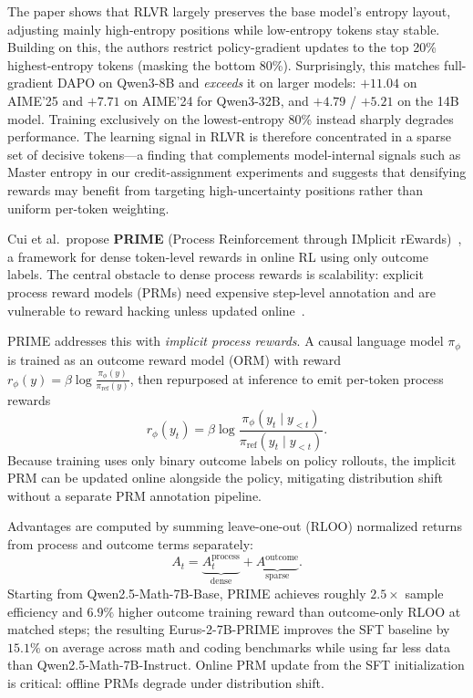 \documentclass[times, 10pt,twocolumn]{article}
\begin{document}
The paper shows that RLVR largely preserves the base model's entropy layout,
adjusting mainly high-entropy positions while low-entropy tokens stay stable.
Building on this, the authors restrict policy-gradient updates to the top 20\%
highest-entropy tokens (masking the bottom 80\%). Surprisingly, this matches
full-gradient DAPO on Qwen3-8B and \emph{exceeds} it on larger models: $+11.04$
on AIME'25 and $+7.71$ on AIME'24 for Qwen3-32B, and $+4.79$ / $+5.21$ on the
14B model. Training exclusively on the lowest-entropy 80\% instead sharply
degrades performance. The learning signal in RLVR is therefore concentrated in a
sparse set of decisive tokens---a finding that complements model-internal
signals such as Master entropy in our credit-assignment experiments and
suggests that densifying rewards may benefit from targeting high-uncertainty
positions rather than uniform per-token weighting.



Cui et al.\ propose \textbf{PRIME} (Process Reinforcement through IMplicit
rEwards)~\cite{cui2025prime}, a framework for dense token-level rewards in
online RL using only outcome labels. The central obstacle to dense process
rewards is scalability: explicit process reward models (PRMs) need expensive
step-level annotation and are vulnerable to reward hacking unless updated
online~\cite{cui2025prime}.

PRIME addresses this with \emph{implicit process rewards}. A causal language
model $\pi_\phi$ is trained as an outcome reward model (ORM) with reward
$r_\phi(y) = \beta \log \frac{\pi_\phi(y)}{\pi_{\mathrm{ref}}(y)}$, then
repurposed at inference to emit per-token process rewards
\begin{equation}
r_\phi(y_t) = \beta \log \frac{\pi_\phi(y_t \mid y_{<t})}{\pi_{\mathrm{ref}}(y_t \mid y_{<t})}.
\end{equation}
Because training uses only binary outcome labels on policy rollouts, the implicit
PRM can be updated online alongside the policy, mitigating distribution shift
without a separate PRM annotation pipeline.

Advantages are computed by summing leave-one-out (RLOO) normalized returns from
process and outcome terms separately:
\begin{equation}
A_t = \underbrace{A_t^{\mathrm{process}}}_{\text{dense}} +
      \underbrace{A^{\mathrm{outcome}}}_{\text{sparse}}.
\end{equation}
Starting from Qwen2.5-Math-7B-Base, PRIME achieves roughly $2.5\times$ sample
efficiency and $6.9\%$ higher outcome training reward than outcome-only RLOO at
matched steps; the resulting Eurus-2-7B-PRIME improves the SFT baseline by
$15.1\%$ on average across math and coding benchmarks while using far less data
than Qwen2.5-Math-7B-Instruct. Online PRM update from the SFT initialization is
critical: offline PRMs degrade under distribution shift.
\end{document}
